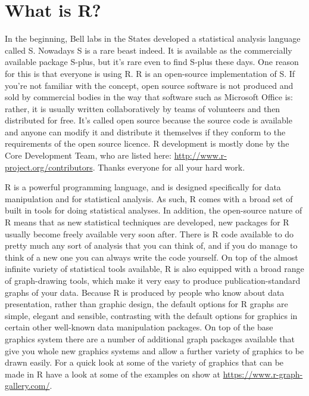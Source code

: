 \documentclass[
]{book}
\begin{document}
\hypertarget{what-is-r}{%
\section{What is R?}\label{what-is-r}}

In the beginning, Bell labs in the States developed a statistical analysis language called S. Nowadays S is a rare beast indeed. It is available as the commercially available package S-plus, but it's rare even to find S-plus these days. One reason for this is that everyone is using R. R is an open-source implementation of S. If you're not familiar with the concept, open source software is not produced and sold by commercial bodies in the way that software such as Microsoft Office is: rather, it is usually written collaboratively by teams of volunteers and then distributed for free. It's called open source because the source code is available and anyone can modify it and distribute it themselves if they conform to the requirements of the open source licence. R development is mostly done by the Core Development Team, who are listed here: \href{http://www.r-project.org/contributors.html}{http://www.r-project.org/contributors}. Thanks everyone for all your hard work.

R is a powerful programming language, and is designed specifically for data manipulation and for statistical analysis. As such, R comes with a broad set of built in tools for doing statistical analyses. In addition, the open-source nature of R means that as new statistical techniques are developed, new packages for R usually become freely available very soon after. There is R code available to do pretty much any sort of analysis that you can think of, and if you do manage to think of a new one you can always write the code yourself. On top of the almost infinite variety of statistical tools available, R is also equipped with a broad range of graph-drawing tools, which make it very easy to produce publication-standard graphs of your data. Because R is produced by people who know about data presentation, rather than graphic design, the default options for R graphs are simple, elegant and sensible, contrasting with the default options for graphics in certain other well-known data manipulation packages. On top of the base graphics system there are a number of additional graph packages available that give you whole new graphics systems and allow a further variety of graphics to be drawn easily. For a quick look at some of the variety of graphics that can be made in R have a look at some of the examples on show at \url{https://www.r-graph-gallery.com/}.
\end{document}

